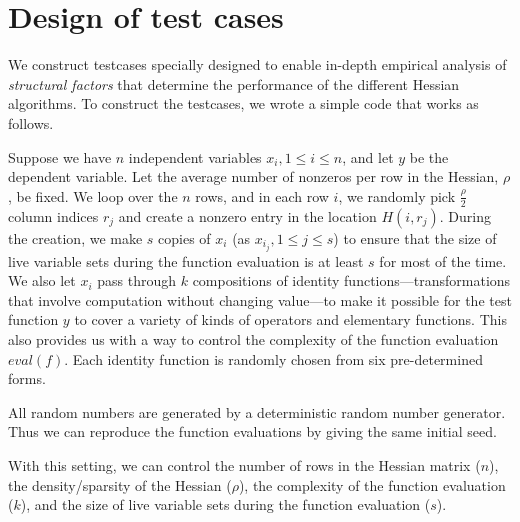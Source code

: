 \documentclass[11pt, a4paper, english]{article}
\begin{document}
\section*{Design of test cases}

We construct testcases specially designed to enable in-depth empirical analysis of {\em structural factors} that determine the performance of the  different Hessian algorithms. 
To construct the testcases, we wrote a simple code that works as follows. 

Suppose we have $n$ independent variables $x_i, 1 \le i \le n$, and let $y$ be the dependent variable. Let the average number of nonzeros per row in the Hessian, $\rho$, be fixed. 
We loop over the $n$ rows, and in each row $i$, we randomly pick $\frac{\rho}{2}$ column indices $r_j$ and create a nonzero entry in the location $H(i,r_{j})$. During the creation, we make $s$ copies of $x_i$ (as $x_{i_j}, 1 \le j \le s$) to ensure that the size of live variable sets during the function evaluation is at least $s$ for most of the time. We also let $x_i$ pass through $k$ compositions of identity functions---transformations that involve computation without changing value---to make it possible for the test function $y$ to cover a variety of kinds of operators and elementary functions. This also provides us with a way to control the complexity of the function evaluation $eval(f)$. Each identity function is randomly chosen from six pre-determined forms. 

All random numbers are generated by a deterministic random number generator. Thus we can reproduce the function evaluations by giving the same initial seed.

With this setting, we can control the number of rows in the Hessian matrix ($n$), the density/sparsity of the Hessian ($\rho$), the complexity of the function evaluation ($k$), and the size of live variable sets during the function evaluation ($s$).
\end{document}
